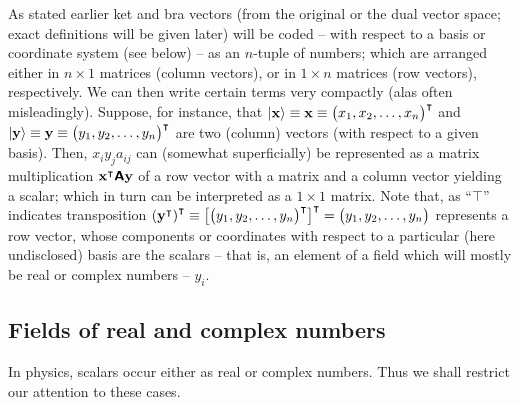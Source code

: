 As stated earlier ket and bra vectors (from the original or the dual vector space; exact definitions will be given later)
will be coded -- with respect to a basis or coordinate system (see below) -- as an $n$-tuple of numbers;
which are arranged either in $n \times 1$ matrices (column vectors),
or in $1 \times n$ matrices (row vectors), respectively.
We can then write certain terms very compactly (alas often misleadingly).
Suppose, for instance, that
$\vert {\bf x} \rangle \equiv {\bf x}\equiv \begin{pmatrix}x_1, x_2,\ldots ,x_n\end{pmatrix}^\intercal $
and
$\vert {\bf y} \rangle \equiv {\bf y}\equiv \begin{pmatrix}y_1, y_2,\ldots ,y_n\end{pmatrix}^\intercal $
are two (column) vectors (with respect to a given basis).
Then, $x_iy_j a_{ij}$ can (somewhat superficially) be represented as a matrix multiplication ${\bf x}^\intercal  \textsf{\textbf{A}} {\bf y}$ of
a row vector with a matrix and a column vector  yielding a scalar; which in turn can be interpreted as a $1 \times 1$ matrix.
Note that, as ``$\intercal$'' indicates transposition
$\left({\bf y}^\intercal \right)^\intercal \equiv \left[ \begin{pmatrix}
y_1,
y_2,
\ldots ,
y_n
\end{pmatrix}^\intercal \right]^\intercal
=
\begin{pmatrix}
y_1,
y_2,
\ldots ,
y_n
\end{pmatrix}
$
represents a row vector, whose components or coordinates with respect to a particular (here undisclosed) basis are the scalars -- that is, an element of a field which will mostly be real or complex numbers -- $y_i$.

\subsection{Fields of real and complex numbers}
\label{2017-m-ch-fdvs-fields}

In physics, scalars occur either as real or complex numbers.
Thus we shall restrict our attention to these cases.

